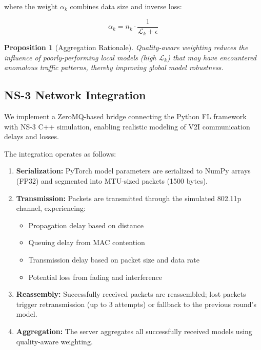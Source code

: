 \documentclass[conference]{IEEEtran}
\newtheorem{proposition}[theorem]{Proposition}
\begin{document}
where the weight $\alpha_k$ combines data size and inverse loss:

\begin{equation}
\alpha_k = n_k \cdot \frac{1}{\mathcal{L}_k + \epsilon}
\end{equation}

\begin{proposition}[Aggregation Rationale]
Quality-aware weighting reduces the influence of poorly-performing local models (high $\mathcal{L}_k$) that may have encountered anomalous traffic patterns, thereby improving global model robustness.
\end{proposition}

\subsection{NS-3 Network Integration}
We implement a ZeroMQ-based bridge connecting the Python FL framework with NS-3 C++ simulation, enabling realistic modeling of V2I communication delays and losses.

The integration operates as follows:
\begin{enumerate}
    \item \textbf{Serialization:} PyTorch model parameters are serialized to NumPy arrays (FP32) and segmented into MTU-sized packets (1500 bytes).

    \item \textbf{Transmission:} Packets are transmitted through the simulated 802.11p channel, experiencing:
    \begin{itemize}
        \item Propagation delay based on distance
        \item Queuing delay from MAC contention
        \item Transmission delay based on packet size and data rate
        \item Potential loss from fading and interference
    \end{itemize}

    \item \textbf{Reassembly:} Successfully received packets are reassembled; lost packets trigger retransmission (up to 3 attempts) or fallback to the previous round's model.

    \item \textbf{Aggregation:} The server aggregates all successfully received models using quality-aware weighting.
\end{enumerate}
\end{document}

